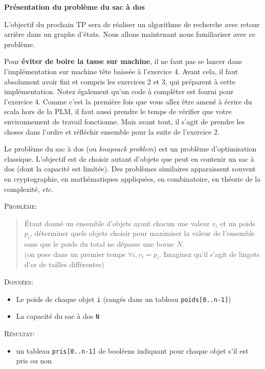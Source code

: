 \documentclass[10pt]{article}\usepackage[nu]{esial}
\begin{document}
\Exercice\textbf{Présentation du problème du sac à dos}

L'objectif du prochain TP sera de réaliser un algorithme de recherche avec
retour arrière dans un graphe d'états. Nous allons maintenant nous familiariser
avec ce problème. 

Pour \textbf{éviter de boire la tasse sur machine}, il ne faut pas se lancer
dans l'implémentation sur machine tête baissée à l'exercice 4. Avant cela, il
faut absolument avoir fini et compris les exercices 2 et 3, qui préparent à
cette implémentation. Notez également qu'un code à compléter est fourni pour
l'exercice 4. Comme c'est la première fois que vous allez être amené à écrire du
scala hors de la PLM, il faut aussi prendre le temps de vérifier que votre
environnement de travail fonctionne. Mais avant tout, il s'agit de prendre les
choses dans l'ordre et réfléchir ensemble pour la suite de l'exercice 2.

\bigskip%
Le problème du sac à dos (ou \textit{knapsack problem}) est un problème
d'optimisation classique. L'objectif est de choisir autant d'objets que peut en
contenir un sac à dos (dont la capacité est limitée). Des problèmes similaires
apparaissent souvent en cryptographie, en mathématiques appliquées, en
combinatoire, en théorie de la complexité, \textit{etc.}  \medskip

\noindent\textsc{Problème:} \vspace{-.2\baselineskip}
\begin{quote}
  Étant donné un ensemble d'objets ayant chacun une valeur $v_i$ et un poids
  $p_i$, déterminer quels objets choisir pour maximiser la
  valeur de l'ensemble sans que le poids du total ne dépasse une borne $N$.\\
  (on pose dans un premier temps $\forall i, v_i=p_i$. Imaginez qu'il s'agit de
  lingots d'or de tailles différentes)
\end{quote}


\textsc{Données}:
\begin{itemize}
\item Le poids de chaque objet \texttt{i} (rangés dans un tableau
  \texttt{poids[0..n-1]})
\item La capacité du sac à dos \texttt{N}
\end{itemize}

\textsc{Résultat}:
\begin{itemize}
\item un tableau \texttt{pris[0..n-1]} de booléens indiquant pour chaque objet
  s'il est pris ou non
\end{itemize}
\end{document}
